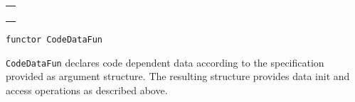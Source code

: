 \begin{isabellebody}
\begin{isamarkuptext}
  \medskip

  \begin{tabular}{l}
  \isa{init{\isacharcolon}\ theory\ {\isasymrightarrow}\ theory} \\
  \isa{get{\isacharcolon}\ theory\ {\isasymrightarrow}\ T} \\
  \isa{change{\isacharcolon}\ theory\ {\isasymrightarrow}\ {\isacharparenleft}T\ {\isasymrightarrow}\ T{\isacharparenright}\ {\isasymrightarrow}\ T} \\
  \isa{change{\isacharunderscore}yield{\isacharcolon}\ theory\ {\isasymrightarrow}\ {\isacharparenleft}T\ {\isasymrightarrow}\ {\isacharprime}a\ {\isacharasterisk}\ T{\isacharparenright}\ {\isasymrightarrow}\ {\isacharprime}a\ {\isacharasterisk}\ T}
  \end{tabular}%
\end{isamarkuptext}%
\isamarkuptrue%
%
\isadelimmlref
%
\endisadelimmlref
%
\isatagmlref
%
\begin{isamarkuptext}%
\begin{mldecls}
  \verb|functor CodeDataFun|
  \end{mldecls}

  \begin{description}

  \item \verb|CodeDataFun| declares code
  dependent data according to the specification provided as
  argument structure.  The resulting structure provides data init and
  access operations as described above.


\end{description}
\end{isamarkuptext}
\end{isabellebody}
